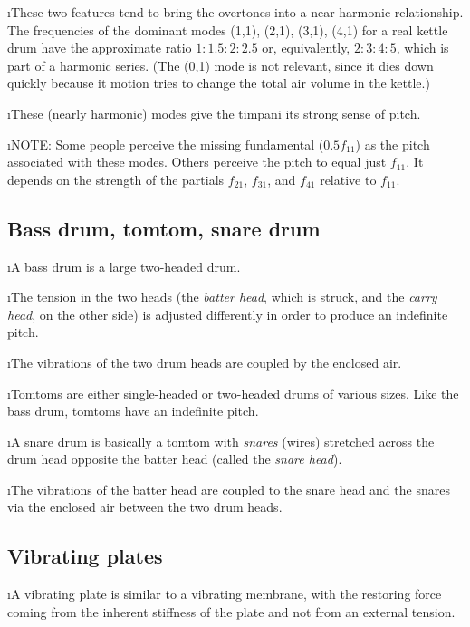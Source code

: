 \i These two features tend to bring the overtones into 
a near harmonic relationship.
The frequencies of the dominant modes 
(1,1), (2,1), (3,1), (4,1) for a real kettle drum
have the approximate ratio
$1:1.5:2:2.5$ or, equivalently, $2:3:4:5$, which is
part of a harmonic series.
(The (0,1) mode is not relevant, since it dies down 
quickly because it motion tries to change the total 
air volume in the kettle.)

\i These (nearly harmonic) modes give the timpani its 
strong sense of pitch.

\i NOTE: Some people perceive the missing 
fundamental ($0.5 f_{11}$) as the pitch associated with 
these modes.
Others perceive the pitch to equal just $f_{11}$.
It depends on the strength of the partials 
$f_{21}$, $f_{31}$, and $f_{41}$ relative to $f_{11}$.

\ei
\subsection{Bass drum, tomtom, snare drum}
\bi

\i A bass drum is a large two-headed drum.

\i The tension in the two heads (the {\em batter head},
which is struck, and the {\em carry head}, on the 
other side) is adjusted differently in 
order to produce an indefinite pitch.

\i The vibrations of the two drum heads are coupled 
by the enclosed air.

\i Tomtoms are either single-headed or two-headed
drums of various sizes.
Like the bass drum, tomtoms have an indefinite pitch.

\i A snare drum is basically a tomtom with 
{\em snares} (wires) stretched across the drum head
opposite the batter head (called the {\em snare head}).

\i The vibrations of the batter head are coupled 
to the snare head and the snares via the enclosed air 
between the two drum heads.

\ei
\subsection{Vibrating plates}
\bi

\i A vibrating plate is similar to a vibrating membrane, 
with the restoring force coming from the inherent 
stiffness of the plate and not from an external tension.

